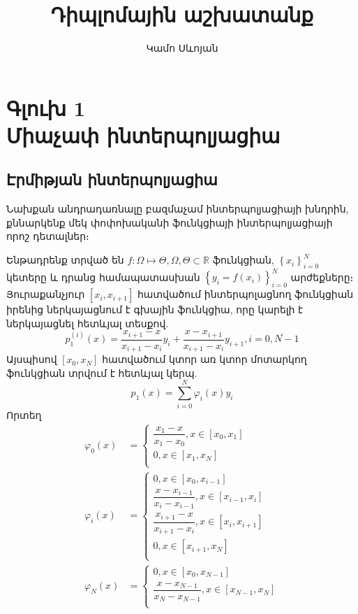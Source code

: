 \documentclass[fleqn, bachelor,subf,12pt,notitlepage]{article}
\title{Դիպլոմային աշխատանք}
\author{Կամո Սևոյան}
\begin{document}
\sloppy


\section*{\centering Գլուխ 1\\ Միաչափ ինտերպոլյացիա}
\subsection*{Էրմիթյան ինտերպոլյացիա}
\hspace{\parindent}Նախքան անդրադառնալը բազմաչամ ինտերպոլյացիայի խնդրին, քննարկենք մեկ փոփոխականի ֆունկցիայի ինտերպոլյացիայի որոշ դետալներ։

Ենթադրենք տրված են $f:\Omega \mapsto \Theta, \Omega, \Theta \subset \mathbb{R}$ ֆունկցիան,  $\left\{x_{i}\right\}_{i=0}^{N}$ կետերը և դրանց համապատասխան $\left\{y_{i}=f\left(x_{i}\right)\right\}_{i=0}^{N}$ արժեքները։ Յուրաքանչյուր $\left[x_{i}, x_{i+1}\right]$ հատվածում  ինտերպոլացնող ֆունկցիան իրենից ներկայացնում է գխային ֆունկցիա, որը կարելի է ներկայացնել հետևյալ տեսքով.
\begin{equation}
p_{1}^{(i)}\left(x\right)=\dfrac{x_{i+1}-x}{x_{i+1}-x_{i}}y_{i}+\dfrac{x-x_{i+1}}{x_{i+1}-x_{i}}y_{i+1}, i=\overline{0, N-1}
\end{equation}
Այսպիսով $\left[x_{0}, x_{N}\right]$ հատվածում կտոր առ կտոր մոտարկող ֆունկցիան տրվում է հետևյալ կերպ.
\begin{equation}
p_{1}\left(x\right)=\sum_{i=0}^{N}\varphi_{i} \left(x\right)y_{i}
\end{equation}
Որտեղ 
\begin{equation}
\begin{aligned}
\varphi_{0}\left(x\right)&=\begin{cases}
\dfrac{x_{1}-x}{x_{1}-x_{0}}, x\in \left[x_{0}, x_{1}\right]\\
0, x\in \left[x_{1}, x_{N}\right]\\
\end{cases}\\
\varphi_{i}\left(x\right)&=\begin{cases}
0, x\in \left[x_{0}, x_{i-1}\right]\\
\dfrac{x-x_{i-1}}{x_{i}-x_{i-1}}, x\in \left[x_{i-1}, x_{i}\right]\\
\dfrac{x_{i+1}-x}{x_{i+1}-x_{i}}, x\in \left[x_{i}, x_{i+1}\right]\\
0, x\in \left[x_{i+1}, x_{N}\right]\\
\end{cases}\\
\varphi_{N}\left(x\right)&=\begin{cases}
0, x\in \left[x_{0}, x_{N-1}\right]\\
\dfrac{x-x_{N-1}}{x_{N}-x_{N-1}}, x\in \left[x_{N-1}, x_{N}\right]\\
\end{cases}
\end{aligned}
\end{equation}
\end{document}
